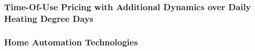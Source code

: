 \subsubsection{Time-Of-Use Pricing with Additional Dynamics over Daily Heating Degree Days}
\label{Sub-subsection:TOU-Pricing-with-Additional-Dynamics-over-Daily-Heating-Degree-Days}


\subsubsection{Home Automation Technologies}
\label{Sub-subsection:Home-Automation-Technologies}

